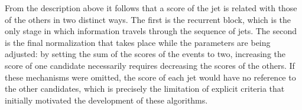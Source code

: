 

From the description above it follows that a score of the jet is related with those of the others in two distinct ways. The first is the recurrent block, which is the only stage in which information travels through the sequence of jets. The second is the final normalization that takes place while the parameters are being adjusted: by setting the sum of the scores of the events to two, increasing the score of one candidate necessarily requires decreasing the scores of the others. If these mechanisms were omitted, the score of each jet would have no reference to the other candidates, which is precisely the limitation of explicit criteria that initially motivated the development of these algorithms.\medskip

